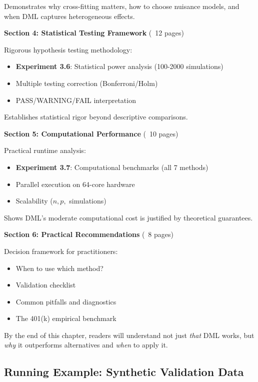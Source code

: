 Demonstrates why cross-fitting matters, how to choose nuisance models, and when DML captures heterogeneous effects.

\textbf{Section 4: Statistical Testing Framework} (~12 pages)

Rigorous hypothesis testing methodology:
\begin{itemize}
    \item \textbf{Experiment 3.6}: Statistical power analysis (100-2000 simulations)
    \item Multiple testing correction (Bonferroni/Holm)
    \item PASS/WARNING/FAIL interpretation
\end{itemize}

Establishes statistical rigor beyond descriptive comparisons.

\textbf{Section 5: Computational Performance} (~10 pages)

Practical runtime analysis:
\begin{itemize}
    \item \textbf{Experiment 3.7}: Computational benchmarks (all 7 methods)
    \item Parallel execution on 64-core hardware
    \item Scalability ($n, p, $ simulations)
\end{itemize}

Shows DML's moderate computational cost is justified by theoretical guarantees.

\textbf{Section 6: Practical Recommendations} (~8 pages)

Decision framework for practitioners:
\begin{itemize}
    \item When to use which method?
    \item Validation checklist
    \item Common pitfalls and diagnostics
    \item The 401(k) empirical benchmark
\end{itemize}

By the end of this chapter, readers will understand not just \textit{that} DML works, but \textit{why} it outperforms alternatives and \textit{when} to apply it.

\subsection{Running Example: Synthetic Validation Data}

